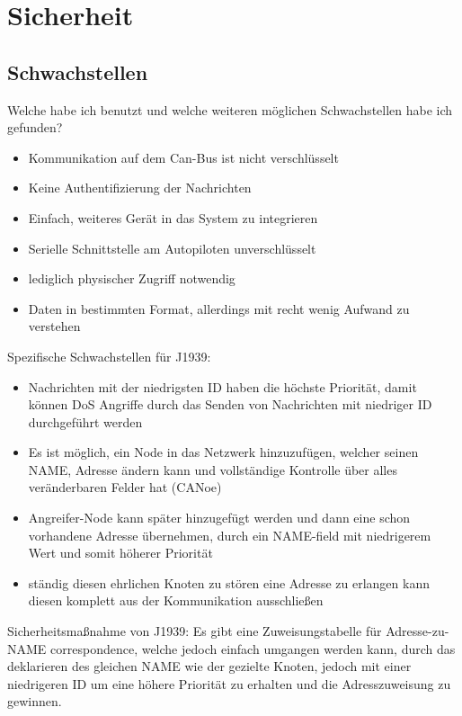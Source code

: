 \chapter{Sicherheit}

\section{Schwachstellen}
Welche habe ich benutzt und welche weiteren möglichen Schwachstellen habe ich gefunden?
\begin{itemize}
    \item Kommunikation auf dem Can-Bus ist nicht verschlüsselt
    \item Keine Authentifizierung der Nachrichten
    \item Einfach, weiteres Gerät in das System zu integrieren
    \item Serielle Schnittstelle am Autopiloten unverschlüsselt
    \item lediglich physischer Zugriff notwendig
    \item Daten in bestimmten Format, allerdings mit recht wenig Aufwand zu verstehen
\end{itemize}
Spezifische Schwachstellen für J1939:
\begin{itemize}
    \item Nachrichten mit der niedrigsten ID haben die höchste Priorität, damit können DoS Angriffe durch das Senden von Nachrichten mit niedriger ID durchgeführt werden
    \item Es ist möglich, ein Node in das Netzwerk hinzuzufügen, welcher seinen NAME, Adresse ändern kann und vollständige Kontrolle über alles veränderbaren Felder hat (CANoe)
    \item Angreifer-Node kann später hinzugefügt werden und dann eine schon vorhandene Adresse übernehmen, durch ein NAME-field mit niedrigerem Wert und somit höherer Priorität
    \item ständig diesen ehrlichen Knoten zu stören eine Adresse zu erlangen kann diesen komplett aus der Kommunikation ausschließen
\end{itemize}
Sicherheitsmaßnahme von J1939:
Es gibt eine Zuweisungstabelle für Adresse-zu-NAME correspondence, welche jedoch einfach umgangen werden
kann, durch das deklarieren des gleichen NAME wie der gezielte Knoten, jedoch mit einer niedrigeren ID
um eine höhere Priorität zu erhalten und die Adresszuweisung zu gewinnen.
